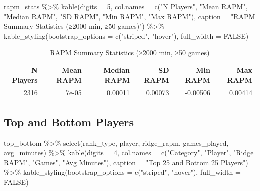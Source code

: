 \documentclass[
  letterpaper,
  DIV=11,
  numbers=noendperiod]{scrartcl}
\newenvironment{Shaded}{\begin{snugshade}}{\end{snugshade}}
\newcommand{\AttributeTok}[1]{\textcolor[rgb]{0.40,0.45,0.13}{#1}}
\newcommand{\ConstantTok}[1]{\textcolor[rgb]{0.56,0.35,0.01}{#1}}
\newcommand{\DecValTok}[1]{\textcolor[rgb]{0.68,0.00,0.00}{#1}}
\newcommand{\FunctionTok}[1]{\textcolor[rgb]{0.28,0.35,0.67}{#1}}
\newcommand{\NormalTok}[1]{\textcolor[rgb]{0.00,0.23,0.31}{#1}}
\newcommand{\SpecialCharTok}[1]{\textcolor[rgb]{0.37,0.37,0.37}{#1}}
\newcommand{\StringTok}[1]{\textcolor[rgb]{0.13,0.47,0.30}{#1}}
\begin{document}
\begin{Shaded}
\begin{Highlighting}[]
\NormalTok{rapm\_stats }\SpecialCharTok{\%\textgreater{}\%}
  \FunctionTok{kable}\NormalTok{(}\AttributeTok{digits =} \DecValTok{5}\NormalTok{,}
        \AttributeTok{col.names =} \FunctionTok{c}\NormalTok{(}\StringTok{"N Players"}\NormalTok{, }\StringTok{"Mean RAPM"}\NormalTok{, }\StringTok{"Median RAPM"}\NormalTok{, }\StringTok{"SD RAPM"}\NormalTok{, }\StringTok{"Min RAPM"}\NormalTok{, }\StringTok{"Max RAPM"}\NormalTok{),}
        \AttributeTok{caption =} \StringTok{"RAPM Summary Statistics (≥2000 min, ≥50 games)"}\NormalTok{) }\SpecialCharTok{\%\textgreater{}\%}
  \FunctionTok{kable\_styling}\NormalTok{(}\AttributeTok{bootstrap\_options =} \FunctionTok{c}\NormalTok{(}\StringTok{"striped"}\NormalTok{, }\StringTok{"hover"}\NormalTok{), }\AttributeTok{full\_width =} \ConstantTok{FALSE}\NormalTok{)}
\end{Highlighting}
\end{Shaded}

\begin{longtable}[t]{rrrrrr}
\caption{\label{tab:summary-stats-table}RAPM Summary Statistics (≥2000 min, ≥50 games)}\\
\toprule
N Players & Mean RAPM & Median RAPM & SD RAPM & Min RAPM & Max RAPM\\
\midrule
2316 & 7e-05 & 0.00011 & 0.00073 & -0.00506 & 0.00414\\
\bottomrule
\end{longtable}

\subsection{Top and Bottom Players}\label{top-and-bottom-players}

\begin{Shaded}
\begin{Highlighting}[]
\NormalTok{top\_bottom }\SpecialCharTok{\%\textgreater{}\%}
  \FunctionTok{select}\NormalTok{(rank\_type, player, ridge\_rapm, games\_played, avg\_minutes) }\SpecialCharTok{\%\textgreater{}\%}
  \FunctionTok{kable}\NormalTok{(}\AttributeTok{digits =} \DecValTok{4}\NormalTok{,}
        \AttributeTok{col.names =} \FunctionTok{c}\NormalTok{(}\StringTok{"Category"}\NormalTok{, }\StringTok{"Player"}\NormalTok{, }\StringTok{"Ridge RAPM"}\NormalTok{, }\StringTok{"Games"}\NormalTok{, }\StringTok{"Avg Minutes"}\NormalTok{),}
        \AttributeTok{caption =} \StringTok{"Top 25 and Bottom 25 Players"}\NormalTok{) }\SpecialCharTok{\%\textgreater{}\%}
  \FunctionTok{kable\_styling}\NormalTok{(}\AttributeTok{bootstrap\_options =} \FunctionTok{c}\NormalTok{(}\StringTok{"striped"}\NormalTok{, }\StringTok{"hover"}\NormalTok{), }\AttributeTok{full\_width =} \ConstantTok{FALSE}\NormalTok{)}
\end{Highlighting}
\end{Shaded}
\end{document}
